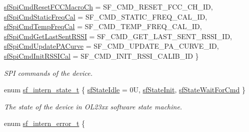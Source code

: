 \begin{DoxyCompactItemize}
\mbox{\hyperlink{group__sf__enum__group_gga06921e348326a2db772246fef63b2545a3d75dd26ce332b5651fe0b201cea83fc}{sf\+Spi\+Cmd\+Reset\+F\+C\+C\+Macro\+Ch}} = S\+F\+\_\+\+C\+M\+D\+\_\+\+R\+E\+S\+E\+T\+\_\+\+F\+C\+C\+\_\+\+C\+H\+\_\+\+ID, 
\mbox{\hyperlink{group__sf__enum__group_gga06921e348326a2db772246fef63b2545a8623a017ff1ad9f3f2e78e51c1c1c3da}{sf\+Spi\+Cmd\+Static\+Freq\+Cal}} = S\+F\+\_\+\+C\+M\+D\+\_\+\+S\+T\+A\+T\+I\+C\+\_\+\+F\+R\+E\+Q\+\_\+\+C\+A\+L\+\_\+\+ID, 
\newline
\mbox{\hyperlink{group__sf__enum__group_gga06921e348326a2db772246fef63b2545a6920f892112eb6f26679cac7c36430a1}{sf\+Spi\+Cmd\+Temp\+Freq\+Cal}} = S\+F\+\_\+\+C\+M\+D\+\_\+\+T\+E\+M\+P\+\_\+\+F\+R\+E\+Q\+\_\+\+C\+A\+L\+\_\+\+ID, 
\mbox{\hyperlink{group__sf__enum__group_gga06921e348326a2db772246fef63b2545a254d063e034b51c5b0907d49596ab223}{sf\+Spi\+Cmd\+Get\+Last\+Sent\+R\+S\+SI}} = S\+F\+\_\+\+C\+M\+D\+\_\+\+G\+E\+T\+\_\+\+L\+A\+S\+T\+\_\+\+S\+E\+N\+T\+\_\+\+R\+S\+S\+I\+\_\+\+ID, 
\mbox{\hyperlink{group__sf__enum__group_gga06921e348326a2db772246fef63b2545a2b3e3582f6c7005c892f3416681ded4a}{sf\+Spi\+Cmd\+Update\+P\+A\+Curve}} = S\+F\+\_\+\+C\+M\+D\+\_\+\+U\+P\+D\+A\+T\+E\+\_\+\+P\+A\+\_\+\+C\+U\+R\+V\+E\+\_\+\+ID, 
\mbox{\hyperlink{group__sf__enum__group_gga06921e348326a2db772246fef63b2545acf5da768d8852e892acfee759cd026e2}{sf\+Spi\+Cmd\+Init\+R\+S\+S\+I\+Cal}} = S\+F\+\_\+\+C\+M\+D\+\_\+\+I\+N\+I\+T\+\_\+\+R\+S\+S\+I\+\_\+\+C\+A\+L\+I\+B\+\_\+\+ID
 \}
\begin{DoxyCompactList}\small\item\em S\+PI commands of the device. \end{DoxyCompactList}\item 
enum \mbox{\hyperlink{group__sf__enum__group_gaedd94907ea20da8e6d1cd3e3e3282c2c}{sf\+\_\+intern\+\_\+state\+\_\+t}} \{ \mbox{\hyperlink{group__sf__enum__group_ggaedd94907ea20da8e6d1cd3e3e3282c2ca42c1bdff1b32704ed68401e8630cc52e}{sf\+State\+Idle}} = 0U, 
\mbox{\hyperlink{group__sf__enum__group_ggaedd94907ea20da8e6d1cd3e3e3282c2ca366330ad10f04c1d7c5625904bd294a5}{sf\+State\+Init}}, 
\mbox{\hyperlink{group__sf__enum__group_ggaedd94907ea20da8e6d1cd3e3e3282c2ca2d8b641d6cf5e3284f6a8bbe038733c1}{sf\+State\+Wait\+For\+Cmd}}
 \}
\begin{DoxyCompactList}\small\item\em The state of the device in O\+L23xx software state machine. \end{DoxyCompactList}\item 
enum \mbox{\hyperlink{group__sf__enum__group_ga9f14f69f90dfff97b98977db7a73ba68}{sf\+\_\+intern\+\_\+error\+\_\+t}} \{ \newline

\end{DoxyCompactItemize}
